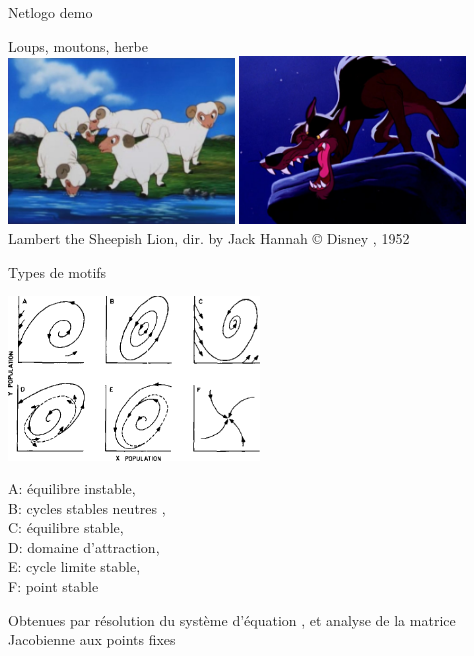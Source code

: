 \documentclass[11,aspectratio=1610]{beamer}
\begin{document}
\begin{frame}{Netlogo demo}

Loups, moutons, herbe\\
\vfill
\centering
\includegraphics[width=0.45\textwidth]{img/sheep.jpg}
\includegraphics[width=0.45\textwidth]{img/wolf.jpg}\\
\tiny{Lambert the Sheepish Lion, dir. by Jack Hannah © Disney , 1952}
\end{frame}






\begin{frame}{Types de motifs}


\centering
\includegraphics[width=0.5\textwidth]{img/behavior_patterns.png}\\
\flushleft



\scriptsize{A: équilibre instable, \\ B: cycles stables neutres ,\\ C: équilibre stable,\\ D: \alert{domaine d'attraction},\\ E: \alert{cycle limite stable},\\ F: point stable }

\tiny{Obtenues par résolution du système d'équation , et analyse de la matrice Jacobienne aux points fixes}


  
\end{frame}
\end{document}
